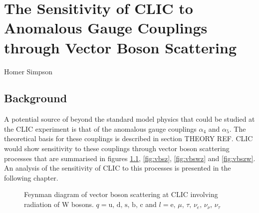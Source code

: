 \chapter{The Sensitivity of CLIC to Anomalous Gauge Couplings through Vector Boson Scattering}
\label{chap:PhysicsAnalysis}

%
{Homer Simpson}

\section{Background}
A potential source of beyond the standard model physics that could be studied at the CLIC experiment is that of the anomalous gauge couplings $\alpha_{4}$ and $\alpha_{5}$.  The theoretical basis for these couplings is described in section THEORY REF.  CLIC would show sensitivity to these couplings through vector boson scattering processes that are summarised in figures \ref{fig:vbsw}, \ref{fig:vbsz}, \ref{fig:vbswz} and \ref{fig:vbszw}.  An analysis of the sensitivity of CLIC to this processes is presented in the following chapter.

\iffalse

\begin{figure}
\caption[Feynman diagram of vector boson scattering at CLIC involving radiation of W bosons.]{Feynman diagram of vector boson scattering at CLIC involving radiation of W bosons.  $q = \text{u, d, s, b, c}$ and $l = \text{e, } \mu \text{, } \tau \text{, } \nu_{e} \text{, } \nu_{\nu} \text{, } \nu_{\tau}$}
\label{fig:vbsw}
\end{figure}

